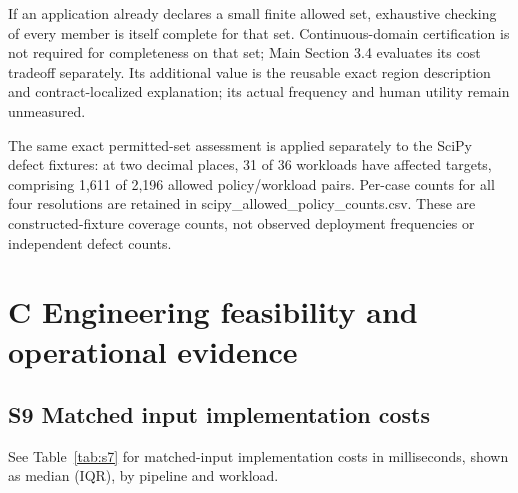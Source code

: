\documentclass[11pt,a4paper]{article}
\theoremstyle{plain}
\theoremstyle{definition}
\theoremstyle{remark}
\begin{document}
If an application already declares a small finite allowed set, exhaustive checking of every member is itself complete for that set. Continuous-domain certification is not required for completeness on that set; Main Section 3.4 evaluates its cost tradeoff separately. Its additional value is the reusable exact region description and contract-localized explanation; its actual frequency and human utility remain unmeasured.

The same exact permitted-set assessment is applied separately to the SciPy defect fixtures: at two decimal places, 31 of 36 workloads have affected targets, comprising 1,611 of 2,196 allowed policy/workload pairs. Per-case counts for all four resolutions are retained in scipy\_allowed\_policy\_counts.csv. These are constructed-fixture coverage counts, not observed deployment frequencies or independent defect counts.


\section*{C Engineering feasibility and operational evidence}


\subsection*{S9 Matched input implementation costs}\label{sec:s9}

See Table~\ref{tab:s7} for matched-input implementation costs in milliseconds, shown as median (IQR), by pipeline and workload.
\end{document}
